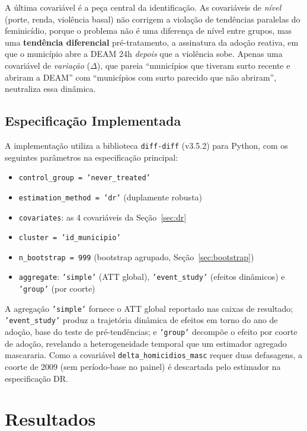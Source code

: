 \documentclass[twocolumn, 10pt]{article}
\begin{document}
A última covariável é a peça central da identificação. As covariáveis de
\textit{nível} (porte, renda, violência basal) não corrigem a violação de
tendências paralelas do feminicídio, porque o problema não é uma diferença de
nível entre grupos, mas uma \textbf{tendência diferencial} pré-tratamento, a
assinatura da adoção reativa, em que o município abre a DEAM 24h \textit{depois}
que a violência sobe. Apenas uma covariável de \textit{variação}
($\Delta$), que pareia ``municípios que tiveram surto recente e abriram a DEAM''
com ``municípios com surto parecido que não abriram'', neutraliza essa dinâmica.

\subsection{Especificação Implementada}

A implementação utiliza a biblioteca \texttt{diff-diff} (v3.5.2) para Python,
com os seguintes parâmetros na especificação principal:

\begin{itemize}
  \item \texttt{control\_group = 'never\_treated'}
  \item \texttt{estimation\_method = 'dr'} (duplamente robusta)
  \item \texttt{covariates}: as 4 covariáveis da Seção~\ref{sec:dr}
  \item \texttt{cluster = 'id\_municipio'}
  \item \texttt{n\_bootstrap = 999} (bootstrap agrupado, Seção~\ref{sec:bootstrap})
  \item \texttt{aggregate}: \texttt{'simple'} (ATT global), \texttt{'event\_study'}
        (efeitos dinâmicos) e \texttt{'group'} (por coorte)
\end{itemize}

A agregação \texttt{'simple'} fornece o ATT global reportado nas caixas de
resultado; \texttt{'event\_study'} produz a trajetória dinâmica de efeitos em
torno do ano de adoção, base do teste de pré-tendências; e \texttt{'group'}
decompõe o efeito por coorte de adoção, revelando a heterogeneidade temporal que
um estimador agregado mascararia. Como a covariável \texttt{delta\_homicidios\_masc}
requer duas defasagens, a coorte de 2009 (sem período-base no painel) é descartada
pelo estimador na especificação DR.

\section{Resultados}
\end{document}
